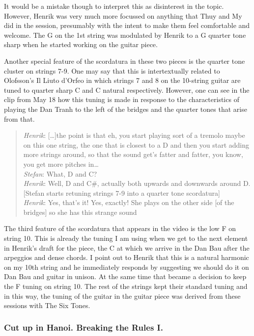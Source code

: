 It would be a mistake though to interpret this as disinterest in the
topic. However, Henrik was very much more focussed on anything that
Thuy and My did in the session, presumably with the intent to make
them feel comfortable and welcome. The G on the 1st string was
modulated by Henrik to a G quarter tone sharp when he started working
on the guitar piece.
 
Another special feature of the scordatura in these two pieces is the
quarter tone cluster on strings 7-9. One may say that this is
intertextually related to Olofsson's Il Liuto d'Orfeo in which strings
7 and 8 on the 10-string guitar are tuned to quarter sharp C and C
natural respectively. However, one can see in the clip from May 18 how
this tuning is made in response to the characteristics of playing the
Dan Tranh to the left of the bridges and the quarter tones that arise
from that.
 
\begin{quote}
  \emph{Henrik}: [\ldots]the point is that eh, you start playing sort of a
  tremolo maybe on this one string, the one that is closest to a D and
  then you start adding more strings around, so that the sound get's
  fatter and fatter, you know, you get more pitches in\ldots\\
  \emph{Stefan}: What, D and C?\\
  \emph{Henrik}: Well, D and C\#, actually both upwards and
  downwards around D.  [Stefan starts retuning strings 7-9 into a
  quarter tone scordatura]\\
  \emph{Henrik}: Yes, that's it! Yes, exactly! She
  plays on the other side [of the bridges] so she has this strange
  sound
\end{quote}

The third feature of the scordatura that appears in the video is the
low F on string 10. This is already the tuning I am using when we get
to the next element in Henrik's draft for the piece, the C at which we
arrive in the Dan Bau after the arpeggios and dense chords. I point
out to Henrik that this is a natural harmonic on my 10th string and he
immediately responds by suggesting we should do it on Dan Bau and
guitar in unison. At the same time that became a decision to keep the
F tuning on string 10. The rest of the strings kept their standard
tuning and in this way, the tuning of the guitar in the guitar piece
was derived from these sessions with The Six Tones.

\subsubsection{Cut up in Hanoi. Breaking the Rules I.}
\label{sec:cut-up-hanoi}

